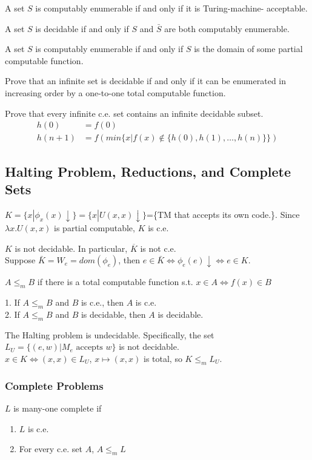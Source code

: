  A set $S$ is computably enumerable if and only if it is
Turing-machine-
acceptable.

 A set $S$ is decidable if and only if $S$ and $\bar{S}$ are both
computably
enumerable.

 A set $S$ is computably enumerable if and only if $S$ is the
domain of
some partial computable function.

 Prove that an infinite set is decidable if and only if it can
be
enumerated in increasing order by a one-to-one total computable function.

 Prove that every infinite c.e. set contains an infinite
decidable subset.
\begin{align*}
  h(0) &= f(0)\\
  h(n+1) &= f(min\{x|f(x) \notin \{h(0), h(1),\ldots, h(n)\}\})
\end{align*}


\subsection{Halting Problem, Reductions, and Complete Sets}

 $K=\{x|\phi_x(x)\downarrow\}=\{x|U(x,x)\downarrow\}$=\{TM
that accepts its own code.\}. Since $\lambda x.U(x,x)$ is partial computable,
$K$ is c.e.

 $K$ is not decidable. In particular, $\overline{K}$ is not
c.e.\\
Suppose $\bar{K} = W_e = dom(\phi_e)$, then $e \in \bar{K} \Leftrightarrow
\phi_e(e)\downarrow \Leftrightarrow e \in K$.

 $A \le_m B$ if there is a total computable function
s.t. $x \in A \Leftrightarrow f(x) \in B$

 1. If $A \le_m B$ and $B$ is c.e., then $A$ is c.e.\\
2. If $A \le_m B$ and $B$ is decidable, then $A$ is decidable.

 The Halting problem is undecidable. Specifically, the set
$L_U=\{(e,w)|M_e \text{ accepts } w\}$ is not decidable.\\
$x \in K \Leftrightarrow (x,x) \in L_U$, $x \mapsto (x,x)$ is total, so $K \le_m
L_U$.

\subsubsection{Complete Problems}
 $L$ is many-one complete if
\begin{enumerate}
  \item $L$ is c.e.
  \item For every c.e. set $A$, $A \le_m L$
\end{enumerate}

